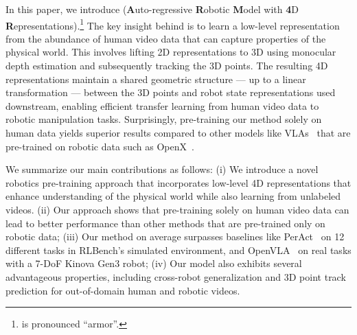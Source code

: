 In this paper, we introduce \smodel{} (\textbf{A}uto-regressive \textbf{R}obotic \textbf{M}odel with \textbf{4}D \textbf{R}epresentations).\footnote{\smodel{} is pronounced ``armor''.} The key insight behind \smodel{} is to learn a low-level representation from the abundance of human video data that can capture properties of the physical world. This involves lifting 2D representations to 3D using monocular depth estimation and subsequently tracking the 3D points. The resulting 4D representations maintain a shared geometric structure --- up to a linear transformation --- between the 3D points and robot state representations used downstream, enabling efficient transfer learning from human video data to robotic manipulation tasks. Surprisingly, pre-training our method solely on human data yields superior results compared to other models like VLAs~\cite{kimOpenVLAOpenSourceVisionLanguageAction2024} that are pre-trained on robotic data such as OpenX~\cite{open_x_embodiment_rt_x_2023}.



We summarize our main contributions as follows: (i) We introduce a novel robotics pre-training approach that incorporates low-level 4D representations that enhance understanding of the physical world while also learning from unlabeled videos.
(ii) Our approach shows that pre-training solely on human video data can lead to better performance than other methods that are pre-trained only on robotic data;
(iii) Our method on average surpasses baselines like PerAct~\cite{shridhar2023perceiver} on 12 different tasks in RLBench's simulated environment, and OpenVLA~\cite{kimOpenVLAOpenSourceVisionLanguageAction2024} on real tasks with a 7-DoF Kinova Gen3 robot; 
(iv) Our model also exhibits several advantageous properties, including cross-robot generalization and 3D point track prediction for out-of-domain human and robotic videos.


